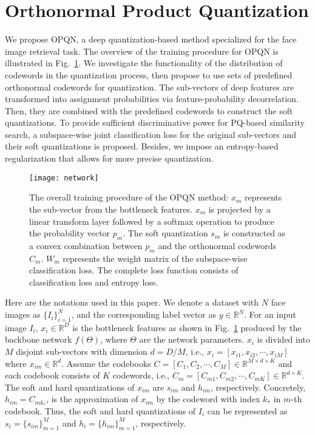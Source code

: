 \documentclass{elsarticle}
\begin{document}
\section{Orthonormal Product Quantization} \label{sec:3}
We propose OPQN, a deep quantization-based method specialized for the face image retrieval task. The overview of the training procedure for OPQN is illustrated in Fig.~\ref{opqn}. We investigate the functionality of the distribution of codewords in the quantization process, then propose to use sets of predefined orthonormal codewords for quantization. The sub-vectors of deep features are transformed into assignment probabilities via feature-probability decorrelation. Then, they are combined with the predefined codewords to construct the soft quantizations. To provide sufficient discriminative power for PQ-based similarity search, a subspace-wise joint classification loss for the original sub-vectors and their soft quantizations is proposed. Besides, we impose an entropy-based regularization that allows for more precise quantization.

\begin{figure}[h]
	\centering
	\texttt{[image: network]}
	\caption{The overall training procedure of the OPQN method: $x_m$ represents the sub-vector from the bottleneck features. $x_{m}$ is projected by a linear transform layer followed by a softmax operation to produce the probability vector $p_{m}$. The soft quantization $s_{m}$ is constructed as a convex combination between $p_{m}$ and the orthonormal codewords $C_{m}$. $W_{m}$ represents the weight matrix of the subspace-wise classification loss. The complete loss function consists of classification loss and entropy loss. 
	}
	\label{opqn}
\end{figure}

Here are the notations used in this paper. We denote a dataset with $N$ face images as $\{I_{i}\}_{i=1}^N$, and the corresponding label vector as $y\in \mathbb{R}^N$. For an input image $I_i$, $x_i \in \mathbb{R}^D$ is the bottleneck features as shown in Fig.~\ref{opqn} produced by the backbone network $f(\Theta)$, where $\Theta$ are the network parameters. $x_{i}$ is divided into $M$ disjoint sub-vectors with dimension $d={D}/{M}$, i.e., $x_i = [x_{i1}, x_{i2},\cdots,x_{iM}]$ where $x_{im} \in \mathbb{R}^{d}$. Assume the codebooks $C=[C_1, C_2,\cdots,C_M] \in \mathbb{R}^{M \times d \times K}$ and each codebook consists of $K$ codewords, i.e., $C_m = [C_{m1}, C_{m2},\cdots, C_{mK}] \in \mathbb{R}^{d \times K}$. The soft and hard quantizations of $x_{im}$ are $s_{im}$ and $h_{im}$, respectively. Concretely, $h_{im}=C_{mk_{*}}$, is the approximation of $x_{im}$ by the codeword with index $k_{*}$ in $m$-th codebook. Thus, the soft and hard quantizations of $I_i$ can be represented as $s_i = \{s_{im}\}_{m=1}^M$ and $h_i = \{h_{im}\}_{m=1}^M$, respectively. 
\end{document}
